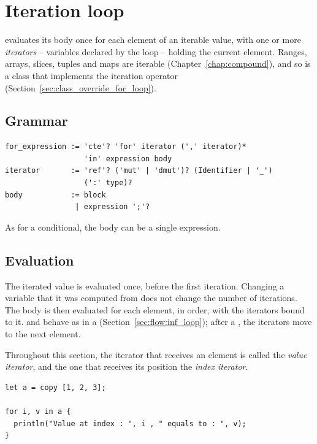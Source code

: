 \vfill%
\pagebreak
\section{Iteration loop}%
\label{sec:flow:for_loop}
\label{sec:flow:for_loops}

 evaluates its body once for each element of an iterable value, with
one or more \textit{iterators} -- variables declared by the loop -- holding the
current element. Ranges, arrays, slices, tuples and maps are iterable
(Chapter~\ref{chap:compound}), and so is a class that implements the iteration
operator (Section~\ref{sec:class_override_for_loop}).

\subsection{Grammar}

\begin{lstlisting}[style=grammarVerb]
for_expression := 'cte'? 'for' iterator (',' iterator)*
                  'in' expression body
iterator       := 'ref'? ('mut' | 'dmut')? (Identifier | '_')
                  (':' type)?
body           := block
                | expression ';'?
\end{lstlisting}

As for a conditional, the body can be a single expression.

\subsection{Evaluation}

The iterated value is evaluated once, before the first iteration. Changing a
variable that it was computed from does not change the number of iterations. The
body is then evaluated for each element, in order, with the iterators bound to
it.  and  behave as in a 
(Section~\ref{sec:flow:inf_loop}); after a , the iterators move
to the next element.

Throughout this section, the iterator that receives an element is called the
\textit{value iterator}, and the one that receives its position the
\textit{index iterator}.

\begin{lstlisting}[style=coloredverbatim, escapechar=@]
let a = copy [1, 2, 3];

for i, v in a {
  println("Value at index : ", i , " equals to : ", v);
}
\end{lstlisting}

